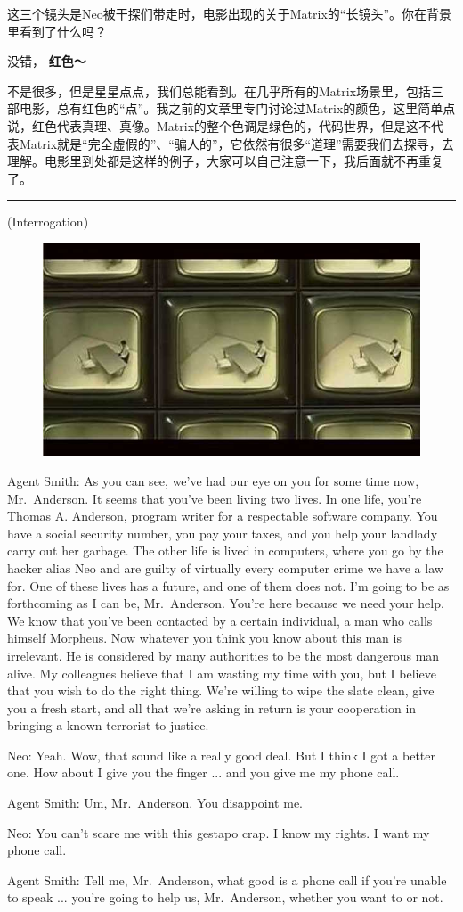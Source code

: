 \documentclass[UTF8]{ctexart}
\newcommand{\myparsep}{\noindent \rule[0.5ex]{\linewidth}{1pt}}
\newenvironment{myquote}{\color{green} \setlength{\leftskip}{6em} \setlength{\rightskip}{4em} \setlength{\parindent}{-2em}}{\par}
\begin{document}
这三个镜头是Neo被干探们带走时，电影出现的关于Matrix的“长镜头”。你在背景里看到了什么吗？

没错，{\color{red} \bf 红色～}

不是很多，但是星星点点，我们总能看到。在几乎所有的Matrix场景里，包括三部电影，总有红色的“点”。我之前的文章里专门讨论过Matrix的颜色，这里简单点说，红色代表真理、真像。Matrix的整个色调是绿色的，代码世界，但是这不代表Matrix就是“完全虚假的”、“骗人的”，它依然有很多“道理”需要我们去探寻，去理解。电影里到处都是这样的例子，大家可以自己注意一下，我后面就不再重复了。

\myparsep

\begin{myquote}
(Interrogation)

\begin{figure}[htb]
\centering
\includegraphics[width=0.5\linewidth]{fig/read_Matrix-15}
\end{figure}

Agent Smith: As you can see, we've had our eye on you for some time now, Mr.~Anderson. It seems that you've been living two lives. In one life, you're Thomas A. Anderson, program writer for a respectable software company. You have a social security number, you pay your taxes, and you help your landlady carry out her garbage. The other life is lived in computers, where you go by the hacker alias Neo and are guilty of virtually every computer crime we have a law for. One of these lives has a future, and one of them does not. I'm going to be as forthcoming as I can be, Mr.~Anderson. You're here because we need your help. We know that you've been contacted by a certain individual, a man who calls himself Morpheus. Now whatever you think you know about this man is irrelevant. He is considered by many authorities to be the most dangerous man alive. My colleagues believe that I am wasting my time with you, but I believe that you wish to do the right thing. We're willing to wipe the slate clean, give you a fresh start, and all that we're asking in return is your cooperation in bringing a known terrorist to justice.

Neo: Yeah. Wow, that sound like a really good deal. But I think I got a better one. How about I give you the finger ... and you give me my phone call.

Agent Smith: Um, Mr.~Anderson. You disappoint me.

Neo: You can't scare me with this gestapo crap. I know my rights. I want my phone call.

Agent Smith: Tell me, Mr.~Anderson, what good is a phone call if you're unable to speak ... you're going to help us, Mr.~Anderson, whether you want to or not.
\end{myquote}
\end{document}
